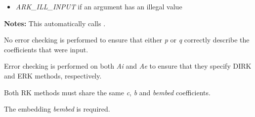 \documentclass[letterpaper,10pt,english]{sphinxmanual}
\begin{document}
\begin{fulllineitems}
\begin{description}
\begin{itemize}
\item {} 
\emph{ARK\_ILL\_INPUT} if an argument has an illegal value

\end{itemize}

\end{description}

\textbf{Notes:} This automatically calls {\hyperref[c_interface/User_callable:c.ARKodeSetImEx]{\emph{}}}.

No error checking is performed to ensure that either \emph{p} or \emph{q}
correctly describe the coefficients that were input.

Error checking is performed on both \emph{Ai} and \emph{Ae} to ensure
that they specify DIRK and ERK methods, respectively.

Both RK methods must share the same \emph{c}, \emph{b} and \emph{bembed} coefficients.

The embedding \emph{bembed} is required.

\end{fulllineitems}

\end{document}
